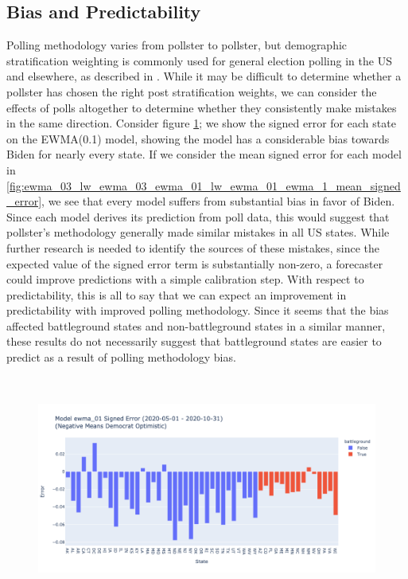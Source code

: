 \begin{table}[H]
    \centering
    
    \label{tab:aggregate_polling_2020-05-01_-_2020-10-31_mean_sample_size}
\end{table}

\subsection{Bias and Predictability}
Polling methodology varies from pollster to pollster, but demographic stratification weighting is commonly used for general election polling in the US and elsewhere, as described in \cite{Lauderdale2020ModelbasedPP}. While it may be difficult to determine whether a pollster has chosen the right post stratification weights, we can consider the effects of polls altogether to determine whether they consistently make mistakes in the same direction. Consider figure \ref{fig:ewma_01_2020-05-01-2020-10-31_signed_error}; we show the signed error for each state on the EWMA(0.1) model, showing the model has a considerable bias towards Biden for nearly every state. If we consider the mean signed error for each model in \ref{fig:ewma_03_lw_ewma_03_ewma_01_lw_ewma_01_ewma_1_mean_signed_error}, we see that every model suffers from substantial bias in favor of Biden. Since each model derives its prediction from poll data, this would suggest that pollster's methodology generally made similar mistakes in all US states. While further research is needed to identify the sources of these mistakes, since the expected value of the signed error term is substantially non-zero, a forecaster could improve predictions with a simple calibration step. With respect to predictability, this is all to say that we can expect an improvement in predictability with improved polling methodology. Since it seems that the bias affected battleground states and non-battleground states in a similar manner, these results do not necessarily suggest that battleground states are easier to predict as a result of polling methodology bias.

\begin{figure}[H]
    \centering
    \includegraphics[height=20em]{figures/ewma_01_2020-05-01-2020-10-31_signed_error.png}
    \caption{}
    \label{fig:ewma_01_2020-05-01-2020-10-31_signed_error}
\end{figure}


